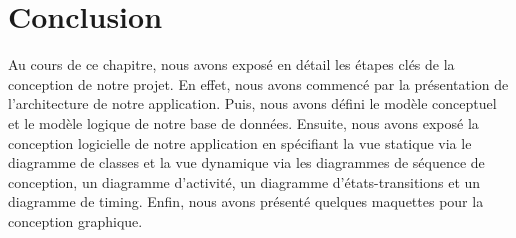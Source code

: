 \section*{Conclusion}
Au cours de ce chapitre, nous avons exposé en détail les étapes clés de la conception de notre projet. En effet, nous avons commencé par la présentation de l’architecture de notre application. Puis, nous avons défini le modèle conceptuel et le modèle logique de notre base de données. Ensuite, nous avons exposé la conception logicielle de notre application en spécifiant la vue statique via le diagramme de classes et la vue dynamique via les diagrammes de séquence de conception, un diagramme d’activité, un diagramme d’états-transitions et un diagramme de timing. Enfin, nous avons présenté quelques maquettes pour la conception graphique.


